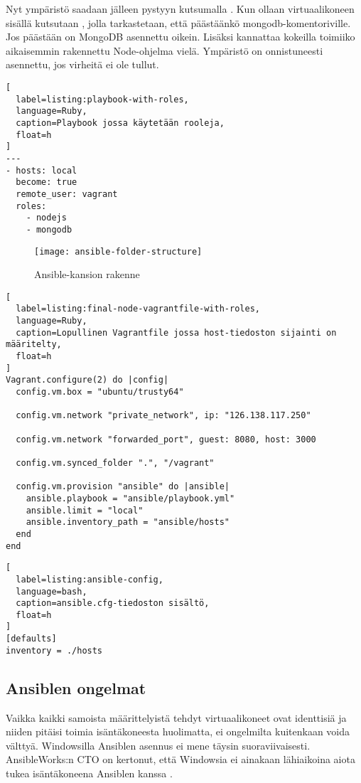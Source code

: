 Nyt ympäristö saadaan jälleen pystyyn kutsumalla . Kun ollaan virtuaalikoneen sisällä kutsutaan , jolla tarkastetaan, että päästäänkö mongodb-komentoriville. Jos päästään on MongoDB asennettu oikein. Lisäksi kannattaa kokeilla toimiiko aikaisemmin rakennettu Node-ohjelma vielä. Ympäristö on onnistuneesti asennettu, jos virheitä ei ole tullut.

\begin{lstlisting}[
  label=listing:playbook-with-roles,
  language=Ruby,
  caption=Playbook jossa käytetään rooleja,
  float=h
]
---
- hosts: local
  become: true
  remote_user: vagrant
  roles:
    - nodejs
    - mongodb
\end{lstlisting}

\begin{figure}[h]
  \texttt{[image: ansible-folder-structure]}
  \caption{Ansible-kansion rakenne}
  \label{fig:ansible-folder-structure}
\end{figure}

\begin{lstlisting}[
  label=listing:final-node-vagrantfile-with-roles,
  language=Ruby,
  caption=Lopullinen Vagrantfile jossa host-tiedoston sijainti on määritelty,
  float=h
]
Vagrant.configure(2) do |config|
  config.vm.box = "ubuntu/trusty64"

  config.vm.network "private_network", ip: "126.138.117.250"

  config.vm.network "forwarded_port", guest: 8080, host: 3000

  config.vm.synced_folder ".", "/vagrant"

  config.vm.provision "ansible" do |ansible|
    ansible.playbook = "ansible/playbook.yml"
    ansible.limit = "local"
    ansible.inventory_path = "ansible/hosts"
  end
end
\end{lstlisting}

\begin{lstlisting}[
  label=listing:ansible-config,
  language=bash,
  caption=ansible.cfg-tiedoston sisältö,
  float=h
]
[defaults]
inventory = ./hosts
\end{lstlisting}

\subsection{Ansiblen ongelmat}

Vaikka kaikki samoista määrittelyistä tehdyt virtuaalikoneet ovat identtisiä ja niiden pitäisi toimia isäntäkoneesta huolimatta, ei ongelmilta kuitenkaan voida välttyä. Windowsilla Ansiblen asennus ei mene täysin suoraviivaisesti. AnsibleWorks:n CTO on kertonut, että Windowsia ei ainakaan lähiaikoina aiota tukea isäntäkoneena Ansiblen kanssa \cite{link:windows-support-for-ansible}.

